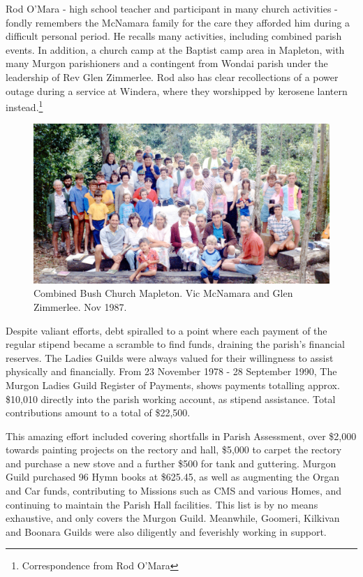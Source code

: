 Rod O'Mara - high school teacher and participant in many church activities - fondly remembers the McNamara family for the care they afforded him during a difficult personal period. He recalls many activities, including combined parish events. In addition, a church camp at the Baptist camp area in Mapleton, with many Murgon parishioners and a contingent from Wondai parish under the leadership of Rev Glen Zimmerlee. Rod also has clear recollections of a power outage during a service at Windera, where they worshipped by kerosene lantern instead.\footnote{Correspondence from Rod O'Mara}








\begin{figure}[!htb]
\begin{center}
\includegraphics[width=1.\textwidth,center]{../images/bushChuchMapleton1987.jpg}
\caption{Combined Bush Church Mapleton. Vic McNamara and Glen Zimmerlee. Nov 1987.}
\end{center}
\end{figure}




Despite valiant efforts, debt spiralled to a point where each payment of the regular stipend became a scramble to find funds, draining the parish's financial reserves. The Ladies Guilds were always valued for their willingness to assist physically and financially. From 23 November 1978 - 28 September 1990, The Murgon Ladies Guild Register of Payments, shows payments totalling approx. \$10,010 directly into the parish working account, as stipend assistance. Total contributions amount to a total of \$22,500.



This amazing effort included covering shortfalls in Parish Assessment, over \$2,000 towards painting projects on the rectory and hall, \$5,000 to carpet the rectory and purchase a new stove and a further \$500 for tank and guttering. Murgon Guild purchased 96 Hymn books at \$625.45, as well as augmenting the Organ and Car funds, contributing to Missions such as CMS and various Homes, and continuing to maintain the Parish Hall facilities. This list is by no means exhaustive, and only covers the Murgon Guild. Meanwhile, Goomeri, Kilkivan and Boonara Guilds were also diligently and feverishly working in support.



